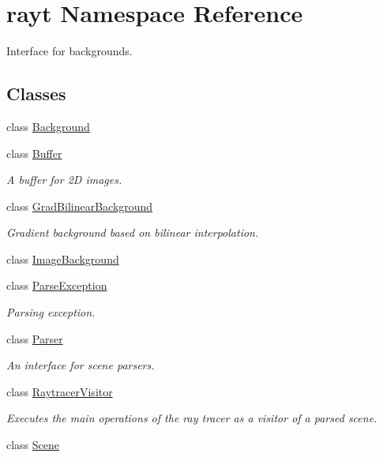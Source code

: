 \hypertarget{namespacerayt}{}\section{rayt Namespace Reference}
\label{namespacerayt}


Interface for backgrounds.  


\subsection*{Classes}
\begin{DoxyCompactItemize}
\item 
class \mbox{\hyperlink{classrayt_1_1_background}{Background}}
\item 
class \mbox{\hyperlink{classrayt_1_1_buffer}{Buffer}}
\begin{DoxyCompactList}\small\item\em A buffer for 2D images. \end{DoxyCompactList}\item 
class \mbox{\hyperlink{classrayt_1_1_grad_bilinear_background}{Grad\+Bilinear\+Background}}
\begin{DoxyCompactList}\small\item\em Gradient background based on bilinear interpolation. \end{DoxyCompactList}\item 
class \mbox{\hyperlink{classrayt_1_1_image_background}{Image\+Background}}
\item 
class \mbox{\hyperlink{classrayt_1_1_parse_exception}{Parse\+Exception}}
\begin{DoxyCompactList}\small\item\em Parsing exception. \end{DoxyCompactList}\item 
class \mbox{\hyperlink{classrayt_1_1_parser}{Parser}}
\begin{DoxyCompactList}\small\item\em An interface for scene parsers. \end{DoxyCompactList}\item 
class \mbox{\hyperlink{classrayt_1_1_raytracer_visitor}{Raytracer\+Visitor}}
\begin{DoxyCompactList}\small\item\em Executes the main operations of the ray tracer as a visitor of a parsed scene. \end{DoxyCompactList}\item 
class \mbox{\hyperlink{classrayt_1_1_scene}{Scene}}

\end{DoxyCompactItemize}
